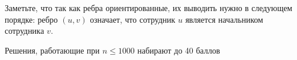 Заметьте, что так как ребра ориентированные, их выводить нужно в следующем порядке: ребро $(u, v)$ означает, что сотрудник $u$ является начальником сотрудника $v$.

Решения, работающие при $n \leq 1000$ набирают до 40 баллов